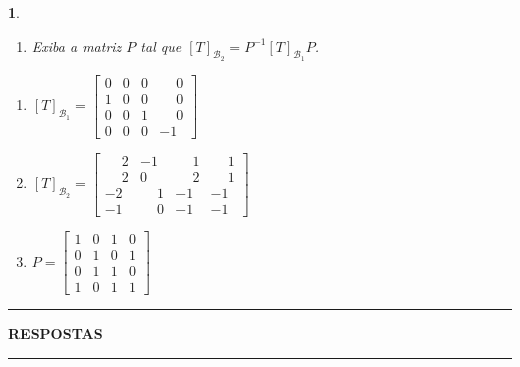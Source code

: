 \documentclass[12pt]{exam}
\newtheorem{exercicio}{}
\newcommand{\complex}{\mathbb{C}}
\newcommand{\cp}[1]{\mathbb{#1}}
\begin{document}
\begin{exercicio}
\begin{enumerate}[label=({\alph*})]
\[\begin{pmatrix}
          0 & 1\\
          1 & 0
        \end{pmatrix}; \begin{pmatrix}
          1 & 0\\
          1 & 1
        \end{pmatrix}; \begin{pmatrix}
          0 & 1\\
          0 & 1
        \end{pmatrix}\right\}
      \]
      de $\cp{M}_2(\complex)$.
      \item Exiba a matriz $P$ tal que $[T]_{\mathcal{B}_2} = P^{-1}[T]_{\mathcal{B}_1}P$.
    \end{enumerate}
    \begin{solucao}
      \begin{enumerate}[label=({\alph*})]
        \item $[T]_{\mathcal{B}_1} = \begin{bmatrix}
          0 & 0 & 0 & \phantom{-}0\\
          1 & 0 & 0 & \phantom{-}0\\
          0 & 0 & 1 & \phantom{-}0\\
          0 & 0 & 0 & -1
        \end{bmatrix}$

        \item $[T]_{\mathcal{B}_2} = \begin{bmatrix}
          \phantom{-}2 & -1 & \phantom{-}1 & \phantom{-}1\\
          \phantom{-}2 & 0 & \phantom{-}2 & \phantom{-}1\\
          -2 & \phantom{-}1 & -1 & -1\\
          -1 & \phantom{-}0 & -1 & -1
        \end{bmatrix}$

        \item $P = \begin{bmatrix}
          1 & 0 & 1 & 0\\
          0 & 1 & 0 & 1\\
          0 & 1 & 1 & 0\\
          1 & 0 & 1 & 1
        \end{bmatrix}$
      \end{enumerate}
    \end{solucao}
\end{exercicio}

\newpage
{}
\hrule
\begin{center}
{\large\bf RESPOSTAS}
\end{center}
\hrule

\end{document}
